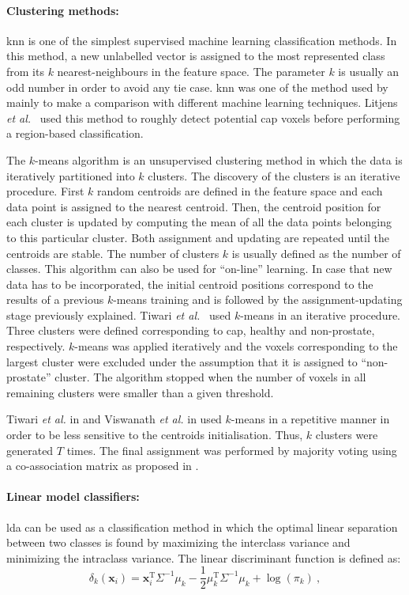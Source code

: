 \paragraph{Clustering methods:}
\acf{knn} is one of the simplest supervised machine learning classification methods.
In this method, a new unlabelled vector is assigned to the most represented class from its $k$ nearest-neighbours in the feature space.
The parameter $k$ is usually an odd number in order to avoid any tie case.
\ac{knn} was one of the method used by \cite{Niaf2011,Niaf2012} mainly to make a comparison with different machine learning techniques.
Litjens \textit{et al.}~\cite{Litjens2012} used this method to roughly detect potential \ac{cap} voxels before performing a region-based classification.

The $k$-means algorithm is an unsupervised clustering method in which the data is iteratively partitioned into $k$ clusters.
The discovery of the clusters is an iterative procedure.
First $k$ random centroids are defined in the feature space and each data point is assigned to the nearest centroid.
Then, the centroid position for each cluster is updated by computing the mean of all the data points belonging to this particular cluster.
Both assignment and updating are repeated until the centroids are stable.
The number of clusters $k$ is usually defined as the number of classes.
This algorithm can also be used for ``on-line'' learning.
In case that new data has to be incorporated, the initial centroid positions correspond to the results of a previous $k$-means training and is followed by the assignment-updating stage previously explained.
Tiwari \textit{et al.}~\cite{Tiwari2007,Tiwari2009} used $k$-means in an iterative procedure.
Three clusters were defined corresponding to \ac{cap}, healthy and non-prostate, respectively.
$k$-means was applied iteratively and the voxels corresponding to the largest cluster were excluded under the assumption that it is assigned to ``non-prostate'' cluster.
The algorithm stopped when the number of voxels in all remaining clusters were smaller than a given threshold.

Tiwari \textit{et al.} in \cite{Tiwari2008} and Viswanath \textit{et al.} in \cite{Viswanath2008,Viswanath2008a} used $k$-means in a repetitive manner in order to be less sensitive to the centroids initialisation.
Thus, $k$ clusters were generated $T$ times.
The final assignment was performed by majority voting using a co-association matrix as proposed in \cite{Fred2005}.


\paragraph{Linear model classifiers:}
\Acf{lda} can be used as a classification method in which the optimal linear separation between two classes is found by maximizing the interclass variance and minimizing the intraclass variance\cite{Friedman1989}.
The linear discriminant function is defined as:
\begin{equation}
	\delta_{k}(\mathbf{x}_i) = \mathbf{x}_i^{\text{T}} \Sigma^{-1} \mu_k - \frac{1}{2} \mu_{k}^{\text{T}} \Sigma^{-1} \mu_k + \log (\pi_k) \ ,
	\label{eq:ldafun}
\end{equation}

